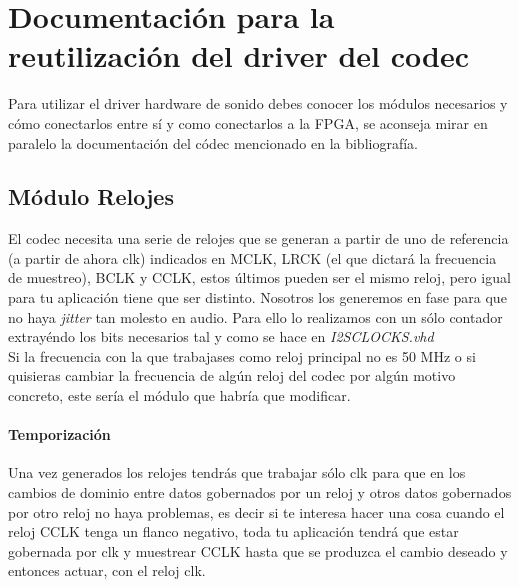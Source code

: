 \appendix


\section{Documentación para la reutilización del driver del codec}
	Para utilizar el driver hardware de sonido debes conocer los módulos necesarios y cómo conectarlos entre sí y como conectarlos a la FPGA, se aconseja mirar en paralelo la documentación del códec mencionado en la bibliografía.
	\subsection{Módulo Relojes}
		El codec necesita una serie de relojes que se generan a partir de uno de referencia (a partir de ahora clk) indicados en \cite{AK4565} MCLK, LRCK (el que dictará la frecuencia de muestreo), BCLK y CCLK, estos últimos pueden ser el mismo reloj, pero igual para tu aplicación tiene que ser distinto.
		Nosotros los generemos en fase para que no haya \emph{jitter} tan molesto en audio. Para ello lo realizamos con un sólo contador extrayéndo los bits necesarios tal y como se hace en \emph{I2SCLOCKS.vhd} \\

	Si la frecuencia con la que trabajases como reloj principal no es 50 MHz o si quisieras cambiar la frecuencia de algún reloj del codec por algún motivo concreto, este sería el módulo que habría que modificar.
		
	\paragraph{Temporización}
Una vez generados los relojes tendrás que trabajar sólo clk para que en los cambios de dominio entre datos gobernados por un reloj y otros datos gobernados por otro reloj no haya problemas, es decir si te interesa hacer una cosa cuando el reloj CCLK tenga un flanco negativo, toda tu aplicación tendrá que estar gobernada por clk y muestrear CCLK hasta que se produzca el cambio deseado y entonces actuar, con el reloj clk.
	
